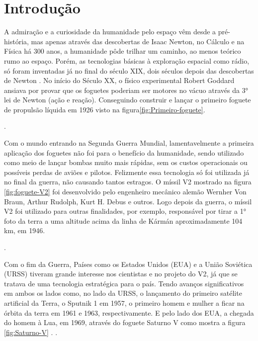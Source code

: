 
\chapter{Introdução}




A admiração e a curiosidade da humanidade pelo espaço vêm desde a pré-história, mas apenas através das descobertas de Isaac Newton, no Cálculo e na Física há 300 anos, a humanidade pôde trilhar um caminho, ao menos teórico rumo ao espaço. Porém, as tecnologias básicas à exploração espacial como rádio, só foram inventadas já no final do século XIX, dois séculos depois das descobertas de Newton \cite{Burgess2021}. No início do Século XX, o físico experimental Robert Goddard ansiava por provar que os foguetes poderiam ser motores no vácuo através da 3° lei de Newton (ação e reação). Conseguindo construir e lançar o primeiro foguete de propulsão líquida em 1926 visto na figura\ref{fig:Primeiro-foguete}.






.


Com o mundo entrando na Segunda Guerra Mundial, lamentavelmente a primeira aplicação dos foguetes não foi para o benefício da humanidade, sendo utilizado como meio de lançar bombas muito mais rápidas, sem os custos operacionais ou possíveis perdas de aviões e pilotos. Felizmente essa tecnologia só foi utilizada já no final da guerra, não causando tantos estragos. O míssil V2 mostrado na figura \ref{fig:foguete-V2} foi desenvolvido pelo engenheiro mecânico alemão Wernher Von Braun, Arthur Rudolph, Kurt H. Debus e outros. Logo depois da guerra, o míssil V2 foi utilizado para outras finalidades, por exemplo, responsável por tirar a 1° foto da terra a uma altitude acima da linha de Kármán \footnotemark{}  aproximadamente 104 km, em 1946.   


 .


Com o fim da Guerra, Países como os Estados Unidos (EUA) e a União Soviética (URSS) tiveram grande interesse nos cientistas e no projeto do V2, já que se tratava de uma tecnologia estratégica para o país. Tendo avanços significativos em ambos os lados como, no lado da URSS, o lançamento do primeiro satélite artificial da Terra, o Sputnik 1 em 1957, o primeiro homem e mulher a ficar na órbita da terra em 1961 e 1963, respectivamente. E pelo lado dos EUA, a chegada do homem à Lua, em 1969, através do foguete Saturno V como mostra a figura \ref{fig:Saturno-V}    \cite{UmaBreveHistoriadaConquistaEspacial}.
 .
 

